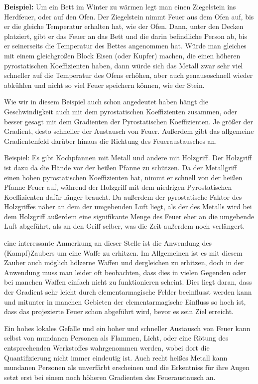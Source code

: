 \documentclass[a5paper,8pt]{book}
\begin{document}
\textbf{Beispiel:}
Um ein Bett im Winter zu wärmen legt man einen Ziegelstein ins Herdfeuer, oder auf den Ofen. Der Ziegelstein nimmt Feuer 
aus dem Ofen auf, bis er die gleiche Temperatur erhalten hat, wie der Ofen. Dann, unter den Decken platziert, gibt er das 
Feuer an das Bett und die darin befindliche Person ab, bis er seinerseits die Temperatur des Bettes angenommen hat.
Würde man gleiches mit einem gleichgroßen Block Eisen (oder Kupfer) machen, die einen höheren pyrostatischen Koeffizienten 
haben,  dann würde sich das Metall zwar sehr viel schneller auf die Temperatur des Ofens erhöhen, aber auch genausoschnell 
wieder abkühlen und nicht so viel Feuer speichern können, wie der Stein.

Wie wir in diesem Beispiel auch schon angedeutet haben hängt die Geschwindigkeit auch mit dem pyrostatischen Koeffizienten 
zusammen, oder besser gesagt mit dem Gradienten der Pyrostatischen Koeffizienten. Je größer der Gradient, desto schneller 
der Austausch von Feuer. Außerdem gibt das allgemeine Gradientenfeld darüber hinaus die Richtung des Feueraustausches an.

Beispiel:
Es gibt Kochpfannen mit Metall und andere mit Holzgriff. Der Holzgriff ist dazu da die Hände vor der heißen Pfanne zu 
schützen. Da der Metallgriff einen hohen pyrostatischen Koeffizienten hat, nimmt er schnell von der heißen Pfanne Feuer 
auf, während der Holzgriff mit dem niedrigen Pyrostatischen Koeffizienten dafür länger braucht.
Da außerdem der pyrostatische Faktor des Holzgriffes näher an dem der umgebenden Luft liegt, als der des Metalls wird 
bei dem Holzgriff außerdem eine signifikante Menge des Feuer eher an die umgebende Luft abgeführt, als an den Griff 
selber, was die Zeit außerdem noch verlängert.\footnotemark[4]


\footnotetext[4] eine interessante Anmerkung an dieser Stelle ist die Anwendung des (Kampf)Zaubers um eine Waffe zu erhitzen. Im 
Allgemeinen ist es mit diesem Zauber auch möglich hölzerne Waffen und dergleichen zu erhitzen, doch in der Anwendung 
muss man leider oft beobachten, dass dies in vielen Gegenden oder bei manchen Waffen einfach nicht zu funktionieren 
scheint.
Dies liegt daran, dass der Gradient sehr leicht durch elementarmagische Felder beeinflusst werden kann und mitunter 
in manchen Gebieten der elementarmagische Einfluss so hoch ist, dass das projezierte Feuer schon abgeführt wird, bevor 
es sein Ziel erreicht.



Ein hohes lokales Gefälle und ein hoher und schneller Austausch von Feuer kann selbst von mundanen Personen als Flammen, 
Licht, oder eine Rötung des entsprechenden Werkstoffes wahrgenommen werden, wobei dort die Quantifizierung nicht immer 
eindeutig ist. Auch recht heißes Metall kann mundanen Personen als unverfärbt erscheinen und die Erkentniss für ihre Augen 
setzt erst bei einem noch höheren Gradienten des Feueraustausch an.
\end{document}
